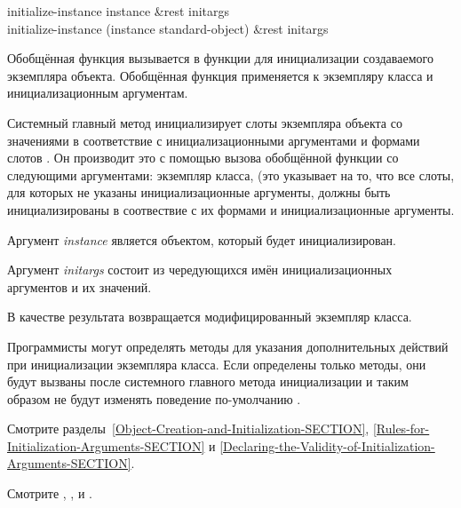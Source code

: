 \begin{defun}
initialize-instance instance &rest initargs \\
initialize-instance (instance standard-object) &rest initargs

Обобщённая функция  вызывается в функции
 для инициализации создаваемого экземпляра
объекта. Обобщённая функция  применяется к экземпляру
класса и инициализационным аргументам.

Системный главный метод  инициализирует слоты
экземпляра объекта со значениями в соответствие с инициализационными аргументами и
формами слотов .
Он производит это с помощью вызова обобщённой функции  со
следующими аргументами: экземпляр класса,  (это указывает на то, что все
слоты, для которых не указаны инициализационные аргументы, должны быть
инициализированы в соотвествие с их формами  и инициализационные
аргументы.

Аргумент \emph{instance} является объектом, который будет инициализирован.

Аргумент \emph{initargs} состоит из чередующихся имён инициализационных аргументов и их
значений.

В качестве результата возвращается модифицированный экземпляр класса.

Программисты могут определять методы  для указания
дополнительных действий при инициализации экземпляра класса. Если определены
только  методы, они будут вызваны после системного главного метода
инициализации и таким образом не будут изменять поведение по-умолчанию
.

Смотрите разделы~\ref{Object-Creation-and-Initialization-SECTION},
\ref{Rules-for-Initialization-Arguments-SECTION} и
\ref{Declaring-the-Validity-of-Initialization-Arguments-SECTION}.

Смотрите ,
,
и .
\end{defun}

